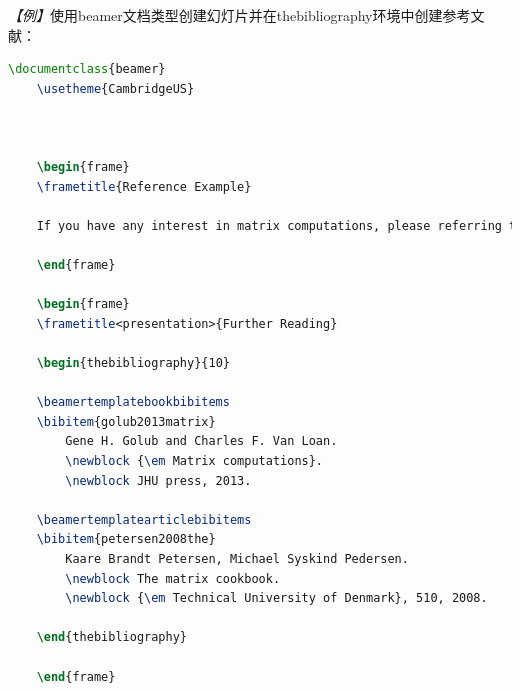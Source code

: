 \emph{【例】}使用beamer文档类型创建幻灯片并在thebibliography环境中创建参考文献：
\begin{lstlisting}[language=TeX]
    \documentclass{beamer}
    \usetheme{CambridgeUS}

    

    \begin{frame}
    \frametitle{Reference Example}

    If you have any interest in matrix computations, please referring to \cite{golub2013matrix, petersen2008the}.

    \end{frame}

    \begin{frame}
    \frametitle<presentation>{Further Reading}

    \begin{thebibliography}{10}

    \beamertemplatebookbibitems
    \bibitem{golub2013matrix}
        Gene H. Golub and Charles F. Van Loan.
        \newblock {\em Matrix computations}.
        \newblock JHU press, 2013.

    \beamertemplatearticlebibitems
    \bibitem{petersen2008the}
        Kaare Brandt Petersen, Michael Syskind Pedersen.
        \newblock The matrix cookbook.
        \newblock {\em Technical University of Denmark}, 510, 2008.

    \end{thebibliography}

    \end{frame}

    
\end{lstlisting}

